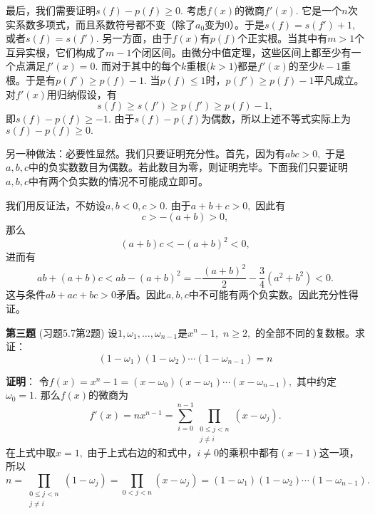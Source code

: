 最后，我们需要证明$s(f) - p(f) \geqslant 0.$ 考虑$f(x)$的微商$f'(x).$ 它是一个$n$次实系数多项式，而且系数符号都不变（除了$a_0$变为0）。于是$s(f) = s(f') + 1,$ 或者$s(f) = s(f').$ 另一方面，由于$f(x)$有$p(f)$个正实根。当其中有$m > 1$个互异实根，它们构成了$m - 1$个闭区间。由微分中值定理，这些区间上都至少有一个点满足$f'(x) = 0.$ 而对于其中的每个$k$重根($k > 1$)都是$f'(x)$的至少$k-1$重根。于是有$p(f') \geqslant p(f) - 1.$ 当$p(f) \leqslant 1$时，$p(f') \geqslant p(f) - 1$平凡成立。对$f'(x)$用归纳假设，有
$$s(f) \geqslant s(f') \geqslant p(f') \geqslant p(f) - 1,$$
即$s(f) - p(f) \geqslant -1.$ 由于$s(f) - p(f)$为偶数，所以上述不等式实际上为$s(f) - p(f) \geqslant 0.$

\vspace{1em}

另一种做法：必要性显然。我们只要证明充分性。首先，因为有$abc > 0,$ 于是$a, b, c$中的负实数数目为偶数。若此数目为零，则证明完毕。下面我们只要证明$a, b, c$中有两个负实数的情况不可能成立即可。

我们用反证法，不妨设$a, b < 0, c > 0.$ 由于$a + b + c > 0,$ 因此有
$$c > -(a + b) > 0,$$
那么
$$(a + b)c < -(a + b)^2 < 0,$$
进而有
$$ab + (a + b)c < ab - (a + b)^2 = -\dfrac{(a + b)^2}{2} - \dfrac{3}{4}(a^2 + b^2) < 0.$$
这与条件$ab + ac + bc > 0$矛盾。因此$a, b, c$中不可能有两个负实数。因此充分性得证。

\fi  %

\newpageorvspace

{\bf 第三题} (习题5.7第2题) 设$1, \omega_1, \ldots, \omega_{n-1}$是$x^n - 1,$ $n \geqslant 2,$ 的全部不同的复数根。求证：
$$(1 - \omega_1)(1 - \omega_2) \cdots (1 - \omega_{n-1}) = n$$

\ifIncludeAnswer

\newpageorvspace

{\bf 证明}： 令$f(x) = x^n - 1 = (x - \omega_0)(x - \omega_1) \cdots (x - \omega_{n-1}),$ 其中约定$\omega_0 = 1.$ 那么$f(x)$的微商为
$$f'(x) = nx^{n-1} = \sum\limits_{i=0}^{n-1} \prod\limits_{\substack{0 \leqslant j < n \\ j \neq i}} (x - \omega_j).$$
在上式中取$x = 1,$ 由于上式右边的和式中，$i \neq 0$的乘积中都有$(x - 1)$这一项，所以
$$n = \prod\limits_{\substack{0 \leqslant j < n \\ j \neq i}} (1 - \omega_j) = \prod\limits_{0 < j < n } (x - \omega_j) = (1 - \omega_1)(1 - \omega_2) \cdots (1 - \omega_{n-1}).$$

\fi  %

\newpageorvspace

